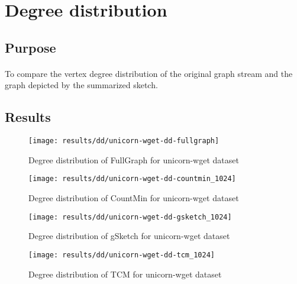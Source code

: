 \section{Degree distribution}

\subsection*{Purpose}

\paragraph{}
To compare the vertex degree distribution of the original graph stream and the graph depicted by the summarized sketch.

\subsection*{Results}

\begin{figure}[H]
    \centering \texttt{[image: results/dd/unicorn-wget-dd-fullgraph]}
    \vspace{-0.5cm}
    \caption{Degree distribution of FullGraph for unicorn-wget dataset}
    \label{fig:unicorn-wget-dd-fullgraph}
\end{figure}

\begin{figure}[H]
    \centering \texttt{[image: results/dd/unicorn-wget-dd-countmin\_1024]}
    \vspace{-0.5cm}
    \caption{Degree distribution of CountMin for unicorn-wget dataset}
    \label{fig:unicorn-wget-dd-countmin_1024}
\end{figure}

\begin{figure}[H]
    \centering \texttt{[image: results/dd/unicorn-wget-dd-gsketch\_1024]}
    \vspace{-0.5cm}
    \caption{Degree distribution of gSketch for unicorn-wget dataset}
    \label{fig:unicorn-wget-dd-gsketch_1024}
\end{figure}

\begin{figure}[H]
    \centering \texttt{[image: results/dd/unicorn-wget-dd-tcm\_1024]}
    \vspace{-0.5cm}
    \caption{Degree distribution of TCM for unicorn-wget dataset}
    \label{fig:unicorn-wget-dd-tcm_1024}
\end{figure}

